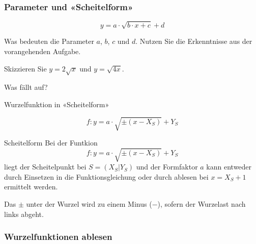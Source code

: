 \newpage


\subsubsection{Parameter und «Scheitelform»}
$$y = a\cdot{} \sqrt{b\cdot{}x + c} + d$$

Was bedeuten die Parameter $a$, $b$, $c$ und $d$. Nutzen Sie die
Erkenntnisse aus der vorangehenden Aufgabe.


Skizzieren Sie $y=2\sqrt{x}$ und $y=\sqrt{4x}$.

Was fällt auf?



\begin{definition}{Wurzelfunktion in «Scheitelform»}{}

  $$f: y = a\cdot{}\sqrt{\pm(x-X_S)} + Y_S$$

\end{definition}

\begin{gesetz}{Scheitelform}{}
  Bei der Funtkion
  $$f: y = a\cdot{}\sqrt{\pm(x-X_S)} + Y_S$$
liegt der Scheitelpunkt bei $S=(X_S | Y_S)$ und der Formfaktor $a$ kann
entweder durch Einsetzen in die Funktionsgleichung oder durch ablesen
bei $x=X_S+1$ ermittelt werden.

Das $\pm$ unter der Wurzel wird zu einem Minus ($-$), sofern der
Wurzelast nach links abgeht.
\end{gesetz}

\newpage



\subsubsection{Wurzelfunktionen ablesen}

